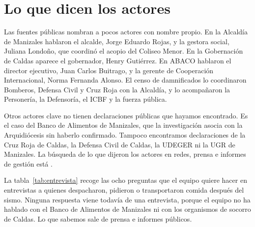 \section{Lo que dicen los actores}

Las fuentes públicas nombran a pocos actores con nombre propio. En la Alcaldía de Manizales hablaron el alcalde, Jorge Eduardo Rojas, y la gestora social, Juliana Londoño, que coordinó el acopio del Coliseo Menor. En la Gobernación de Caldas aparece el gobernador, Henry Gutiérrez. En ABACO hablaron el director ejecutivo, Juan Carlos Buitrago, y la gerente de Cooperación Internacional, Norma Fernanda Alonso. El censo de damnificados lo coordinaron Bomberos, Defensa Civil y Cruz Roja con la Alcaldía, y lo acompañaron la Personería, la Defensoría, el ICBF y la fuerza pública.

Otros actores clave no tienen declaraciones públicas que hayamos encontrado. Es el caso del Banco de Alimentos de Manizales, que la investigación asocia con la Arquidiócesis sin haberlo confirmado. Tampoco encontramos declaraciones de la Cruz Roja de Caldas, la Defensa Civil de Caldas, la UDEGER ni la UGR de Manizales. La búsqueda de lo que dijeron los actores en redes, prensa e informes de gestión está \eninvestigacion.

La tabla~\ref{tab:entrevista} recoge las ocho preguntas que el equipo quiere hacer en entrevistas a quienes despacharon, pidieron o transportaron comida después del sismo. Ninguna respuesta viene todavía de una entrevista, porque el equipo no ha hablado con el Banco de Alimentos de Manizales ni con los organismos de socorro de Caldas. Lo que sabemos sale de prensa e informes públicos.

